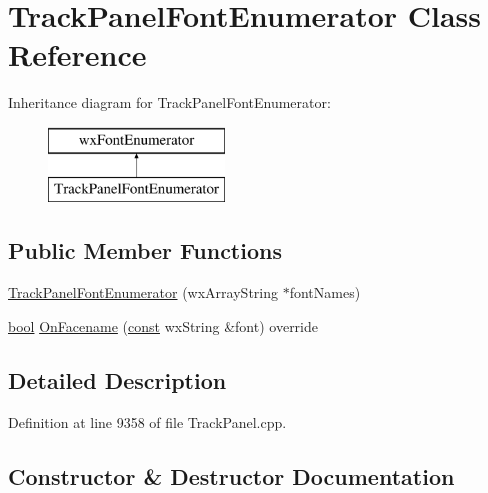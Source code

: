 \hypertarget{class_track_panel_font_enumerator}{}\section{Track\+Panel\+Font\+Enumerator Class Reference}
\label{class_track_panel_font_enumerator}
Inheritance diagram for Track\+Panel\+Font\+Enumerator\+:\begin{figure}[H]
\begin{center}
\leavevmode
\includegraphics[height=2.000000cm]{class_track_panel_font_enumerator}
\end{center}
\end{figure}
\subsection*{Public Member Functions}
\begin{DoxyCompactItemize}
\item 
\hyperlink{class_track_panel_font_enumerator_a68191acae58930738464e3951f9a1742}{Track\+Panel\+Font\+Enumerator} (wx\+Array\+String $\ast$font\+Names)
\item 
\hyperlink{mac_2config_2i386_2lib-src_2libsoxr_2soxr-config_8h_abb452686968e48b67397da5f97445f5b}{bool} \hyperlink{class_track_panel_font_enumerator_a44b667a85d8f8c2c28ece363d18a6e23}{On\+Facename} (\hyperlink{getopt1_8c_a2c212835823e3c54a8ab6d95c652660e}{const} wx\+String \&font) override
\end{DoxyCompactItemize}


\subsection{Detailed Description}


Definition at line 9358 of file Track\+Panel.\+cpp.



\subsection{Constructor \& Destructor Documentation}
